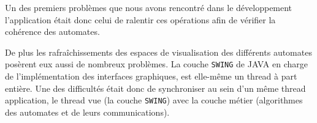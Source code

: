 Un des premiers problèmes que nous avons rencontré dans le développement l'application était donc celui de \og ralentir \fg{} ces opérations afin de vérifier la cohérence des automates.

De plus les rafraîchissements des espaces de visualisation des différents automates posèrent eux aussi de nombreux problèmes. La couche \texttt{SWING} de \textsc{JAVA} en charge de l'implémentation des interfaces graphiques, est elle-même un thread à part entière. Une des difficultés était donc de synchroniser au sein d'un même thread application, le thread \og vue \fg{} (la couche \texttt{SWING}) avec la couche \og métier \fg{} (algorithmes des automates et de leurs communications).


